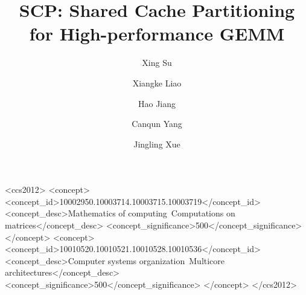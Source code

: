 \documentclass[format=acmsmall, review=false, screen=true, anonymous=false]{acmart}
\begin{document}
\title{SCP: Shared Cache Partitioning for High-performance GEMM}

\author{Xing Su}
\author{Xiangke Liao}
\author{Hao Jiang}
\author{Canqun Yang}
\author{Jingling Xue}



%
%
\begin{CCSXML}
<ccs2012>
<concept>
<concept_id>10002950.10003714.10003715.10003719</concept_id>
<concept_desc>Mathematics of computing~Computations on matrices</concept_desc>
<concept_significance>500</concept_significance>
</concept>
<concept>
<concept_id>10010520.10010521.10010528.10010536</concept_id>
<concept_desc>Computer systems organization~Multicore architectures</concept_desc>
<concept_significance>500</concept_significance>
</concept>
</ccs2012>
\end{CCSXML}


%
%


\maketitle









\end{document}
